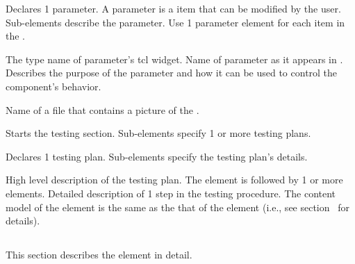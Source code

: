 \documentclass[11pt]{article}
\begin{document}
\begin{description}
\begin{description}
\begin{description}
       Declares 1 \gui{}  parameter.  A parameter is a
      \gui{}  item that can be modified by the user.  Sub-elements describe the
      parameter.  Use 1 parameter element for each item in the \gui.
      \begin{description}
         The type name of parameter's tcl widget.
        Name of parameter as it appears in \gui.
        Describes the purpose of the parameter and
        how it can be used to control the component's behavior.
      \end{description}
      Name of a file that contains a picture of the \gui.
    \end{description}
     Starts the testing section.  Sub-elements specify
    1 or more testing plans.
    \begin{description}
       Declares 1 testing plan.  Sub-elements specify the
      testing plan's details.
      \begin{description}
          High level description of the testing
        plan.  The  element is followed by 1 or more
         elements.
         Detailed description of 1 step in the testing
        procedure.   The content model of the  element is the
        same as the that of the  element (i.e., see
        section~\sechyperref{\SUBSECdescElement} for details).
      \end{description}
    \end{description}
  \end{description}
\end{description}

\subsection{\SUBSECdescElement}
\label{\SUBSECdescElement}

This section describes the  element in detail.

\paragraph{\SUBSUBSECdescElementIntro}
\label{\SUBSUBSECdescElementIntro}
\end{document}
